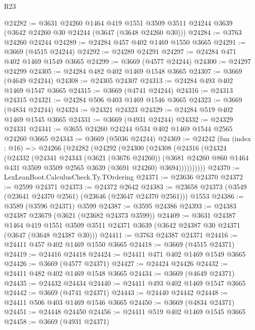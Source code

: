 \begin{lexlean}{R23}
\begin{coremodule}
@24282 := @3631
    @24260
    @1464
    @419
    @1551
    @3509
    @3511
    @24244
    @3639
    (@3642 @24260 @30 @24244 (@3647 (@3648 @24260 @30)))
@24284 := @3763 @24260 @24244
@24289 := @24284 @457 @402 @1469 @1550 @3665
@24291 := @3669 (@4515 @24244)
@24292 := @24289 @24291
@24297 := @24284 @471 @402 @1469 @1549 @3665
@24299 := @3669 (@4577 @24244)
@24300 := @24297 @24299
@24305 := @24284 @482 @402 @1469 @1548 @3665
@24307 := @3669 (@4649 @24244)
@24308 := @24305 @24307
@24313 := @24284 @493 @402 @1469 @1547 @3665
@24315 := @3669 (@4741 @24244)
@24316 := @24313 @24315
@24321 := @24284 @506 @403 @1469 @1546 @3665
@24323 := @3669 (@4834 @24244)
@24324 := @24321 @24323
@24329 := @24284 @519 @402 @1469 @1545 @3665
@24331 := @3669 (@4931 @24244)
@24332 := @24329 @24331
@24341 := @3655 @24260 @24244 @534 @402 @1469 @1544 @2565 @24260 @3665
@24343 := @3669 (@5036 @24244)
@24369 := @24242
    (fun (index : @16) =>
    @24266
      (@24282
        (@24292
          (@24300
            (@24308
              (@24316
                (@24324
                  (@24332
                    (@24341
                      @24343
                      (@3621 (@3676 @24260))
                      (@3681
                        @24260
                        @860
                        @1464
                        @431
                        @3509
                        @3509
                        @2565
                        @3639
                        (@3691 @24260)
                        @3694))))))))))
@24370 := LexLeanBoot.CalculusCheck.Ty.TOrdering
@24371 := @23636 @24370
@24372 := @2599 @24371
@24373 := @24372 @2642
@24383 := @23658 @24373 (@3549 (@23641 @24370 @2561) (@23646 (@23647 @24370 @2561))) @1553
@24386 := @3589 (@3596 @24371) @3599
@24387 := @3595 @24386
@24393 := @24383 @24387 @23679 (@3621 (@23682 @24373 @3599))
@24409 := @3631
    @24387
    @1464
    @419
    @1551
    @3509
    @3511
    @24371
    @3639
    (@3642 @24387 @30 @24371 (@3647 (@3648 @24387 @30)))
@24411 := @3763 @24387 @24371
@24416 := @24411 @457 @402 @1469 @1550 @3665
@24418 := @3669 (@4515 @24371)
@24419 := @24416 @24418
@24424 := @24411 @471 @402 @1469 @1549 @3665
@24426 := @3669 (@4577 @24371)
@24427 := @24424 @24426
@24432 := @24411 @482 @402 @1469 @1548 @3665
@24434 := @3669 (@4649 @24371)
@24435 := @24432 @24434
@24440 := @24411 @493 @402 @1469 @1547 @3665
@24442 := @3669 (@4741 @24371)
@24443 := @24440 @24442
@24448 := @24411 @506 @403 @1469 @1546 @3665
@24450 := @3669 (@4834 @24371)
@24451 := @24448 @24450
@24456 := @24411 @519 @402 @1469 @1545 @3665
@24458 := @3669 (@4931 @24371)

\end{coremodule}
\end{lexlean}
